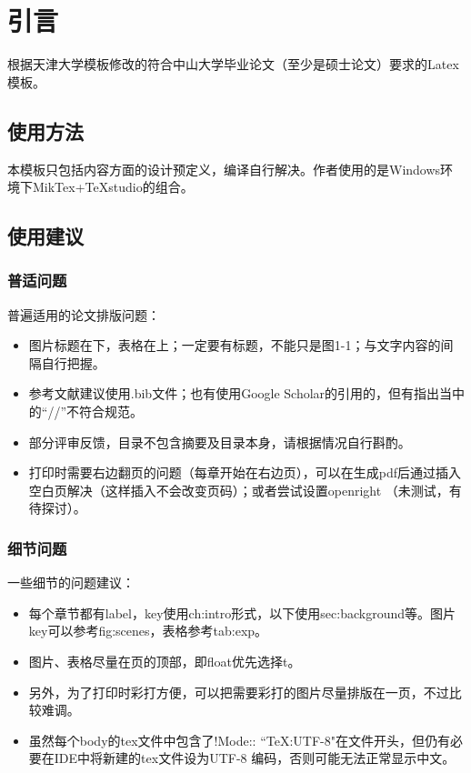 

\chapter{引言}
\label{ch:intro}

根据天津大学模板修改的符合中山大学毕业论文（至少是硕士论文）要求的Latex模板。

\section{使用方法}
\label{sec:usage}

本模板只包括内容方面的设计预定义，编译自行解决。作者使用的是Windows环境下MikTex+TeXstudio的组合。

\section{使用建议}
\label{sec:tips}

\subsection{普适问题}
\label{subsec:common}

普遍适用的论文排版问题：

\begin{itemize}
\item 图片标题在下，表格在上；一定要有标题，不能只是图1-1；与文字内容的间隔自行把握。
\item 参考文献建议使用.bib文件；也有使用Google Scholar的引用的，但有指出当中的“//”不符合规范。
\item 部分评审反馈，目录不包含摘要及目录本身，请根据情况自行斟酌。
\item 打印时需要右边翻页的问题（每章开始在右边页），可以在生成pdf后通过插入空白页解决（这样插入不会改变页码）；或者尝试设置openright （未测试，有待探讨）。
\end{itemize}

\subsection{细节问题}
\label{subsec:specs}

一些细节的问题建议：
\begin{itemize}
\item 每个章节都有label，key使用ch:intro形式，以下使用sec:background等。图片key可以参考fig:scenes，表格参考tab:exp。
\item 图片、表格尽量在页的顶部，即float优先选择t。
\item 另外，为了打印时彩打方便，可以把需要彩打的图片尽量排版在一页，不过比较难调。
\item 虽然每个body的tex文件中包含了!Mode:: ``TeX:UTF-8"在文件开头，但仍有必要在IDE中将新建的tex文件设为UTF-8 编码，否则可能无法正常显示中文。
\end{itemize}

